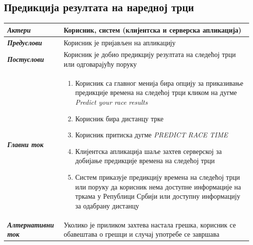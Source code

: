\documentclass[12pt,oneside]{memoir}
\begin{document}
\subsection*{Предикција резултата на наредној трци}
\begin{longtable}{p{0.23\linewidth} p{0.77\linewidth}}
 \hline
 \textit{\textbf{Актери}} & Корисник, систем (клијентска и серверска апликација) \\
\hline

\textit{\textbf{Предуслови}} & Корисник је пријављен на апликацију \\
 \hline
\textit{\textbf{Постуслови}} & Корисник је добио предикцију резултата на следећој трци или одговарајућу поруку \\
 \hline
 \textit{\textbf{Главни ток}} &  
    \begin{enumerate}
        \item Корисник са главног менија бира опцију за приказивање предикције времена на следећој трци кликом на дугме
        \textit{Predict your race results}
        \item Корисник бира дистанцу трке
        \item Корисник притиска дугме \textit{PREDICT RACE TIME}
        \item Клијентска апликација шаље захтев серверској за добијање предикције времена на следећој трци
        \item Систем приказује предикцију времена на следећој трци или поруку да корисник нема доступне информације на тркама у Републици Србији или доступну информацију за одабрану дистанцу
    \end{enumerate}\\
 \hline
\textit{\textbf{Алтернативни ток}} & Уколико је приликом захтева настала грешка, корисник се обавештава о грешци и случај употребе се завршава \\
 \hline
 
\end{longtable}
\end{document}
